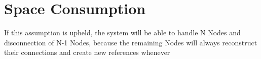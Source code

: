 \section{Space Consumption}
 If this assumption is upheld, the system will be able to handle N Nodes and disconnection of N-1 Nodes, because the remaining Nodes will always reconstruct their connections and create new references  whenever 